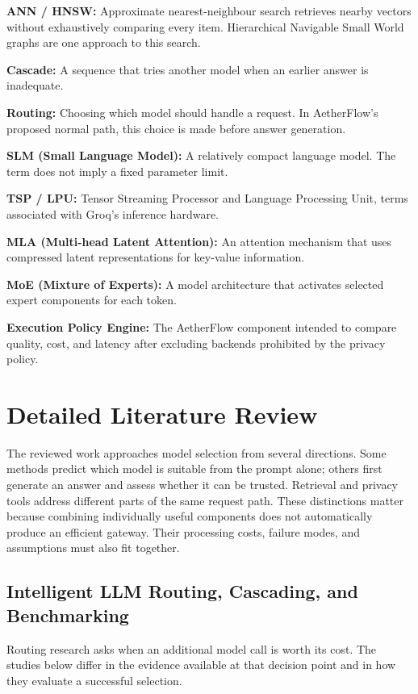 \noindent\textbf{ANN / HNSW:} Approximate nearest-neighbour search retrieves nearby vectors without exhaustively comparing every item. Hierarchical Navigable Small World graphs are one approach to this search.

\noindent\textbf{Cascade:} A sequence that tries another model when an earlier answer is inadequate.

\noindent\textbf{Routing:} Choosing which model should handle a request. In AetherFlow's proposed normal path, this choice is made before answer generation.

\noindent\textbf{SLM (Small Language Model):} A relatively compact language model. The term does not imply a fixed parameter limit.

\noindent\textbf{TSP / LPU:} Tensor Streaming Processor and Language Processing Unit, terms associated with Groq's inference hardware.

\noindent\textbf{MLA (Multi-head Latent Attention):} An attention mechanism that uses compressed latent representations for key-value information.

\noindent\textbf{MoE (Mixture of Experts):} A model architecture that activates selected expert components for each token.

\noindent\textbf{Execution Policy Engine:} The AetherFlow component intended to compare quality, cost, and latency after excluding backends prohibited by the privacy policy.

\section{Detailed Literature Review}

The reviewed work approaches model selection from several directions. Some methods predict which model is suitable from the prompt alone; others first generate an answer and assess whether it can be trusted. Retrieval and privacy tools address different parts of the same request path. These distinctions matter because combining individually useful components does not automatically produce an efficient gateway. Their processing costs, failure modes, and assumptions must also fit together.

\subsection*{Intelligent LLM Routing, Cascading, and Benchmarking}

Routing research asks when an additional model call is worth its cost. The studies below differ in the evidence available at that decision point and in how they evaluate a successful selection.

